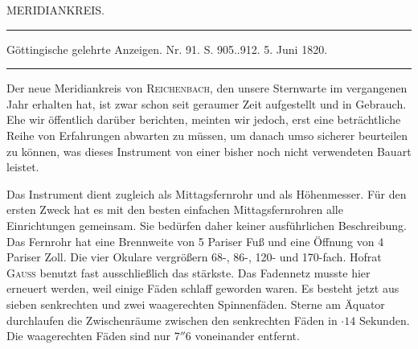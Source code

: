 \clearpage
{}
\hypertarget{native-434-part-lower}{}
\begin{center}
{\Large MERIDIANKREIS.}

\rule{0.6\linewidth}{0.4pt}

Göttingische gelehrte Anzeigen. Nr. 91. S. 905..912. 5. Juni 1820.

\rule{0.6\linewidth}{0.4pt}
\end{center}

Der neue Meridiankreis von \textsc{Reichenbach}, den unsere Sternwarte im vergangenen Jahr erhalten hat, ist zwar schon seit geraumer Zeit aufgestellt und in Gebrauch. Ehe wir öffentlich darüber berichten, meinten wir jedoch, erst eine beträchtliche Reihe von Erfahrungen abwarten zu müssen, um danach umso sicherer beurteilen zu können, was dieses Instrument von einer bisher noch nicht verwendeten Bauart leistet.

Das Instrument dient zugleich als Mittagsfernrohr und als Höhenmesser. Für den ersten Zweck hat es mit den besten einfachen Mittagsfernrohren alle Einrichtungen gemeinsam. Sie bedürfen daher keiner ausführlichen Beschreibung. Das Fernrohr hat eine Brennweite von 5 Pariser Fuß und eine Öffnung von 4 Pariser Zoll. Die vier Okulare vergrößern 68-, 86-, 120- und 170-fach. Hofrat \textsc{Gauss} benutzt fast ausschließlich das stärkste. Das Fadennetz musste hier erneuert werden, weil einige Fäden schlaff geworden waren. Es besteht jetzt aus sieben senkrechten und zwei waagerechten Spinnenfäden. Sterne am Äquator durchlaufen die Zwischenräume zwischen den senkrechten Fäden in $\cdot 14$ Sekunden. Die waagerechten Fäden sind nur $7''6$ voneinander entfernt.

